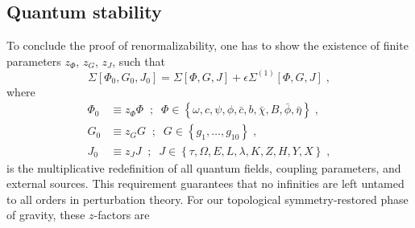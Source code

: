 \documentclass[../main.tex]{subfiles}
\begin{document}
\subsection{Quantum stability}\label{sec:stability;sec:quantum}

To conclude the proof of renormalizability, one has to show the existence of finite parameters $ z_{ \Phi } $, $ z_{ G } $, $ z_{ J } $, such that
\begin{equation}
  \label{eq:multiplicative-renorm}
  \Sigma \left[ \Phi_0, G_0, J_0 \right] = \Sigma \left[ \Phi, G, J \right] + \epsilon\Sigma^{ (1) } \left[ \Phi, G, J \right] \;,
\end{equation}
where
\begin{subequations}%
  \label{eq:field-redef}
  \begin{align}
    \Phi_0 & \equiv z_{ \Phi } \Phi \;\; ; \;\; \Phi \in \left\{ \omega, c, \psi, \phi, \bar{ c }, b, \bar{ \chi }, B, \bar{ \phi }, \bar{ \eta } \right\} \;, \\
    G_0    & \equiv z_{ G } G \;\; ; \;\; G \in \left\{ g_1, \ldots, g_{10} \right\} \;,                                                                       \\
    J_0    & \equiv z_{ J } J \;\; ; \;\; J \in \left\{ \tau, \Omega, E, L, \lambda, K, Z, H, Y, X \right\} \;,
  \end{align}
\end{subequations}
is the multiplicative redefinition of all quantum fields, coupling parameters, and external sources. This requirement guarantees that no infinities are left untamed to all orders in perturbation theory. For our topological symmetry-restored phase of gravity, these $z$-factors are
\end{document}
